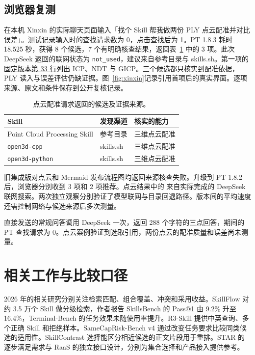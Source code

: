 \documentclass[final,5p,twocolumn,10pt]{elsarticle}
\newcommand{\pointCloudEvidence}{https://github.com/a5c-ai/babysitter/blob/feb68abe397acc14f32b34984975c48fedba2b33/library/specializations/robotics-simulation/skills/point-cloud-processing/SKILL.md\#L33}
\begin{document}
\subsection{浏览器复测}

在本机 Xinxin 的实际聊天页面输入「找个 Skill 帮我做两份 PLY 点云配准并对比误差」。测试记录输入时的查找请求数为 0，点击查找后为 1。PT 1.8.3 耗时 18.525 秒，获得 8 个候选，7 个有明确核查结果，返回表~\ref{tab:xinxin-skills} 中的 3 项。此次 DeepSeek 返回的联网状态为 \texttt{not\_used}，建议来自参考目录与 skills.sh。第一项的 \href{\pointCloudEvidence}{固定版本第 33 行}列出 ICP、NDT 与 GICP。三个候选都只核实到配准依据，PLY 读入与误差评估仍缺证据。图~\ref{fig:xinxin}记录引用首项后的真实界面。逐项来源、原文和条件保存到公开复核记录。

\begin{table}[!ht]
\centering\small
\caption{点云配准请求返回的候选及证据来源。}
\label{tab:xinxin-skills}
\begin{tabularx}{\columnwidth}{@{}Xll@{}}
\toprule
Skill & 发现渠道 & 核实的能力 \\
\midrule
Point Cloud Processing Skill & 参考目录 & 三维点云配准 \\
\texttt{open3d-cpp} & skills.sh & 三维点云配准 \\
\texttt{open3d-python} & skills.sh & 三维点云配准 \\
\bottomrule
\end{tabularx}
\end{table}

旧集成版对点云和 Mermaid 发布流程图均返回来源核查失败。升级到 PT 1.8.2 后，浏览器分别收到 3 项和 2 项推荐。点云结果中的  来自实际完成的 DeepSeek 联网搜索。两次独立观察分别验证了模型联网与目录回退路径。版本间的平均速度还需控制网络与候选来源后多次测量。

直接发送的常规问答调用 DeepSeek 一次，返回 288 个字符的三点回答，期间的 PT 查找请求为 0。点云案例验证到选取引用，两份点云的配准质量和误差尚未测量。

\section{相关工作与比较口径}

2026 年的相关研究分别关注检索匹配、组合覆盖、冲突和采用收益。SkillFlow 对约 3.5 万个 Skill 做分级检索，作者报告 SkillsBench 的 Pass@1 由 9.2\% 升至 16.4\%，Terminal-Bench 的任务效果未随使用率提升\cite{skillflow}。R3-Skill 提供中英查询、多个正确 Skill 和拒绝样本\cite{r3}。SameCapRisk-Bench v4 通过改变任务要求比较同类候选的适用性\cite{risk}。SkillContrast 选择能区分相近候选的正文片段用于重排\cite{contrast}。STAR 的逐步满足需求与 RaaS 的独立接口设计，分别为集合选择和产品接入提供参考\cite{star,raas}。
\end{document}

